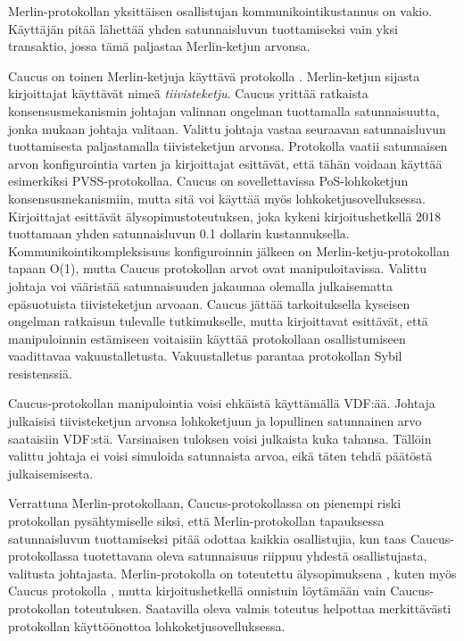 Merlin-protokollan yksittäisen osallistujan kommunikointikustannus on vakio. Käyttäjän pitää lähettää yhden satunnaisluvun tuottamiseksi vain yksi transaktio, jossa tämä paljastaa Merlin-ketjun arvonsa. 

Caucus on toinen Merlin-ketjuja käyttävä protokolla \cite{Caucus}. Merlin-ketjun sijasta kirjoittajat käyttävät nimeä \textit{tiivisteketju}. Caucus yrittää ratkaista konsensusmekanismin johtajan valinnan ongelman tuottamalla satunnaisuutta, jonka mukaan johtaja valitaan. Valittu johtaja vastaa seuraavan satunnaisluvun tuottamisesta paljastamalla tiivisteketjun arvonsa. Protokolla vaatii satunnaisen arvon konfigurointia varten ja kirjoittajat esittävät, että tähän voidaan käyttää esimerkiksi PVSS-protokollaa. Caucus on sovellettavissa PoS-lohkoketjun konsensusmekanismiin, mutta sitä voi käyttää myös lohkoketjusovelluksessa. Kirjoittajat esittävät älysopimustoteutuksen, joka kykeni kirjoitushetkellä 2018 tuottamaan yhden satunnaisluvun 0.1 dollarin kustannuksella. Kommunikointikompleksisuus konfiguroinnin jälkeen on Merlin-ketju-protokollan tapaan O(1), mutta Caucus protokollan arvot ovat manipuloitavissa. Valittu johtaja voi vääristää satunnaisuuden jakaumaa olemalla julkaisematta epäsuotuista tiivisteketjun arvoaan. Caucus jättää tarkoituksella kyseisen ongelman ratkaisun tulevalle tutkimukselle, mutta kirjoittavat esittävät, että manipuloinnin estämiseen voitaisiin käyttää protokollaan osallistumiseen vaadittavaa vakuustalletusta. Vakuustalletus parantaa protokollan Sybil resistenssiä.

Caucus-protokollan manipulointia voisi ehkäistä käyttämällä VDF:ää. Johtaja julkaisisi tiivisteketjun arvonsa lohkoketjuun ja lopullinen satunnainen arvo saataisiin VDF:stä. Varsinaisen tuloksen voisi julkaista kuka tahansa. Tällöin valittu johtaja ei voisi simuloida satunnaista arvoa, eikä täten tehdä päätöstä julkaisemisesta.

Verrattuna Merlin-protokollaan, Caucus-protokollassa on pienempi riski protokollan pysähtymiselle siksi, että Merlin-protokollan tapauksessa satunnaisluvun tuottamiseksi pitää odottaa kaikkia osallistujia, kun taas Caucus-protokollassa tuotettavana oleva satunnaisuus riippuu yhdestä osallistujasta, valitusta johtajasta. Merlin-protokolla on toteutettu älysopimuksena  \cite{MerlinChains}, kuten myös Caucus protokolla \cite{Caucus}, mutta kirjoitushetkellä onnistuin löytämään vain Caucus-protokollan toteutuksen. Saatavilla oleva valmis toteutus helpottaa merkittävästi protokollan käyttöönottoa lohkoketjusovelluksessa.

